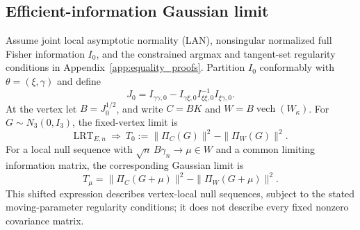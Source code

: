 \subsection{Efficient-information Gaussian limit}
\label{subsec:eq_gaussian}
Assume joint local asymptotic normality (LAN), nonsingular
normalized full Fisher information $I_0$, and the constrained
argmax and tangent-set regularity conditions in
Appendix~\ref{app:equality_proofs}. Partition $I_0$
conformably with $\theta=(\xi,\gamma)$ and define
\begin{equation}\label{eq:eq_J}
 J_0=I_{\gamma\gamma,0}
 -I_{\gamma\xi,0}I_{\xi\xi,0}^{-1}
  I_{\xi\gamma,0}.
\end{equation}
At the vertex let $B=J_0^{1/2}$, and write
$C=BK$ and $W=B\operatorname{vech}(W_\kappa)$.
For $G\sim N_3(0,I_3)$, the fixed-vertex limit is
\begin{equation}\label{eq:eq_vertex_limit}
 \mathrm{LRT}_{E,n}\ \Longrightarrow\
 T_0:=\|\Pi_C(G)\|^2-\|\Pi_W(G)\|^2.
\end{equation}
For a local null sequence with
$\sqrt n\,B\gamma_n\to\mu\in W$ and a common limiting
information matrix, the corresponding Gaussian limit is
\begin{equation}\label{eq:eq_local_limit}
 T_\mu=\|\Pi_C(G+\mu)\|^2
       -\|\Pi_W(G+\mu)\|^2.
\end{equation}
This shifted expression describes vertex-local null sequences,
subject to the stated moving-parameter regularity conditions;
it does not describe every fixed nonzero covariance matrix.

